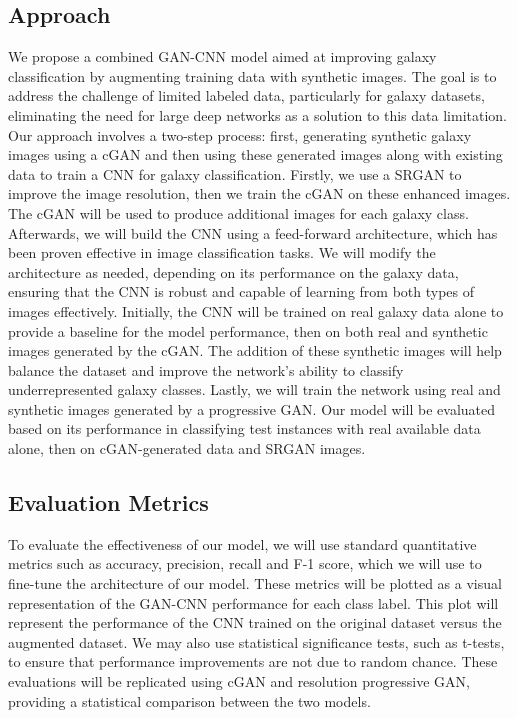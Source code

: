 \subsection{Approach}
We propose a combined GAN-CNN model aimed at improving galaxy classification by augmenting training data with synthetic images. 
The goal is to address the challenge of limited labeled data, particularly for galaxy datasets, eliminating the need for large deep networks as a solution to this data limitation. 
Our approach involves a two-step process: first, generating synthetic galaxy images using a cGAN and then using these generated images along with existing data to train a CNN for galaxy classification. 
Firstly, we use a SRGAN to improve the image resolution, then we train the cGAN on these enhanced images. 
The cGAN will be used to produce additional images for each galaxy class. 
Afterwards, we will build the CNN using a feed-forward architecture, which has been proven effective in image classification tasks. 
We will modify the architecture as needed, depending on its performance on the galaxy data, ensuring that the CNN is robust and capable of learning from both types of images effectively. 
Initially, the CNN will be trained on real galaxy data alone to provide a baseline for the model performance, then on both real and synthetic images generated by the cGAN. 
The addition of these synthetic images will help balance the dataset and improve the network’s ability to classify underrepresented galaxy classes. 
Lastly, we will train the network using real and synthetic images generated by a progressive GAN. 
Our model will be evaluated based on its performance in classifying test instances with real available data alone, then on cGAN-generated data and SRGAN images.


\subsection{Evaluation Metrics}

To evaluate the effectiveness of our model, we will use standard quantitative metrics such as accuracy, precision, recall and F-1 score, which we will use to fine-tune the architecture of our model. 
These metrics will be plotted as a visual representation of the GAN-CNN performance for each class label. 
This plot will represent the performance of the CNN trained on the original dataset versus the augmented dataset. 
We may also use statistical significance tests, such as t-tests, to ensure that performance improvements are not due to random chance. 
These evaluations will be replicated using cGAN and resolution progressive GAN, providing a statistical comparison between the two models.
